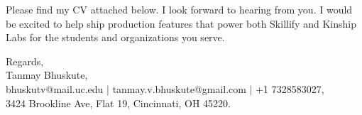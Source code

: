 \documentclass[11pt]{letter}
\begin{document}
\begin{letter}{}
Please find my CV attached below. I look forward to hearing from you. I would be excited to help ship production features that power both Skillify and Kinship Labs for the students and organizations you serve.

{\setlength{\parskip}{0pt}
Regards,\\
Tanmay Bhuskute,\\
bhuskutv@mail.uc.edu $\mid$ tanmay.v.bhuskute@gmail.com $\mid$ +1 7328583027,\\
3424 Brookline Ave, Flat 19, Cincinnati, OH 45220.
}

\end{letter}
\end{document}

